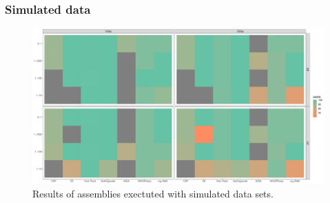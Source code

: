\subsubsection{Simulated data}
\begin{figure}[H]
\centering
\includegraphics[height=.45\textheight, width=.95\textwidth]{Figures/sim_tiles}
\decoRule
\caption[Score of assemblies of simulated data sets]{Results of assemblies exectuted with simulated data sets.}
\label{fig:sim_tiles}
\end{figure}



